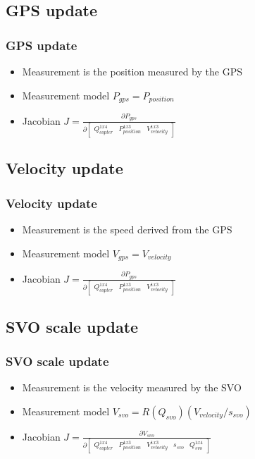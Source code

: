 \documentclass{beamer}
\begin{document}
\subsection{GPS update}
\begin{frame}
\frametitle{GPS update}
  \begin{itemize}
  \item Measurement is the position measured by the GPS
  \item Measurement model $P_{gps} = P_{position}$
  \item Jacobian $J = \frac{\partial P_{gps}}{\partial \begin{bmatrix}Q_{copter}^{1x4} & P_{position}^{1x3} & V_{velocity}^{1x3}\end{bmatrix}}$
  \end{itemize} 
\end{frame}

\subsection{Velocity update}
\begin{frame}
\frametitle{Velocity update}
  \begin{itemize}
  \item Measurement is the speed derived from the GPS
  \item Measurement model $V_{gps} = V_{velocity}$
  \item Jacobian $J = \frac{\partial P_{gps}}{\partial \begin{bmatrix}Q_{copter}^{1x4} & P_{position}^{1x3} & V_{velocity}^{1x3}\end{bmatrix}}$
  \end{itemize} 
\end{frame}

\subsection{SVO scale update}
\begin{frame}
\frametitle{SVO scale update}
  \begin{itemize}
  \item Measurement is the velocity measured by the SVO
  \item Measurement model $V_{svo} = R(Q_{svo})(V_{velocity}/s_{svo})$
  \item Jacobian $J = \frac{\partial V_{svo}}{\partial \begin{bmatrix}Q_{copter}^{1x4} & P_{position}^{1x3} & V_{velocity}^{1x3}& s_{svo} & Q_{svo}^{1x4}\end{bmatrix}}$
  \end{itemize} 
\end{frame}
\end{document}
